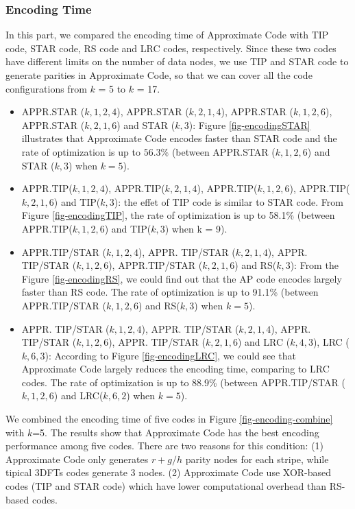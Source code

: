 \documentclass[sigconf]{acmart}
\begin{document}
\subsubsection{Encoding Time}
In this part, we compared the encoding time of Approximate Code with TIP code, STAR code, RS code and LRC codes, respectively.
Since these two codes have different limits on the number of data nodes, we use TIP and STAR code to generate parities in Approximate Code, so that we can cover all the code configurations from $k$ = 5 to $k$ = 17.
\begin{itemize}
    \item APPR.STAR ($k,1,2,4$), APPR.STAR ($k,2,1,4$), APPR.STAR ($k,1,2,6$), APPR.STAR ($k,2,1,6$) and STAR ($k,3$): Figure \ref{fig-encodingSTAR} illustrates that Approximate Code encodes faster than STAR code and the rate of optimization is up to $56.3\%$ (between APPR.STAR ($k,1,2,6$) and STAR ($k,3$) when $k = 5$).

    \item APPR.TIP($k,1,2,4$), APPR.TIP($k,2,1,4$), APPR.TIP($k,1,2,6$), APPR.TIP($k,2,1,6$) and TIP($k,3$): the effet of TIP code is similar to STAR code. From Figure \ref{fig-encodingTIP}, the rate of optimization is up to 58.1\% (between APPR.TIP($k,1,2,6$) and TIP($k,3$) when k = 9).

    \item APPR.TIP/STAR ($k,1,2,4$), APPR. TIP/STAR ($k,2,1,4$), APPR. TIP/STAR ($k,1,2,6$), APPR.TIP/STAR ($k,2,1,6$) and RS($k,3$): From the Figure \ref{fig-encodingRS}, we could find out that the AP code encodes largely faster than RS code. The rate of optimization is up to 91.1\% (between APPR.TIP/STAR ($k,1,2,6$) and RS($k,3$) when $k = 5$).

    \item APPR. TIP/STAR ($k,1,2,4$), APPR. TIP/STAR ($k,2,1,4$), APPR. TIP/STAR ($k,1,2,6$), APPR. TIP/STAR ($k,2,1,6$) and LRC ($k,4,3$), LRC ($k,6,3$): According to Figure \ref{fig-encodingLRC}, we could see that Approximate Code largely reduces the encoding time, comparing to LRC codes. The rate of optimization is up to 88.9\% (between APPR.TIP/STAR ($k,1,2,6$) and LRC($k, 6, 2$) when $k = 5$).
\end{itemize}

We combined the encoding time of five codes in Figure \ref{fig-encoding-combine} with $k$=5. The results show that Approximate Code has the best encoding performance among five codes. There are two reasons for this condition: (1) Approximate Code only generates $r+g/h$ parity nodes for each stripe, while tipical 3DFTs codes generate 3 nodes. (2) Approximate Code use XOR-based codes (TIP and STAR code) which have lower computational overhead than RS-based codes.\par
\end{document}
